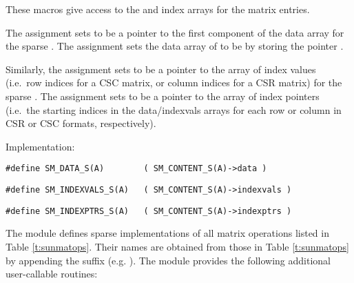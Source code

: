 \begin{itemize}
  These macros give access to the  and index arrays for
  the matrix entries.

  The assignment  sets  to be     
  a pointer to the first component of the data array for the
  sparse  .  The assignment  sets the data array of  to be  by storing
  the pointer . 
  
  Similarly, the assignment 
  sets  to be a pointer to the array of index values
  (i.e.~row indices for a CSC matrix, or column indices for a CSR
  matrix) for the sparse  .  The
  assignment 
  sets  to be a pointer to the array of index
  pointers (i.e.~the starting indices in the data/indexvals arrays for
  each row or column in CSR or CSC formats, respectively).
  
  Implementation:

  \verb|#define SM_DATA_S(A)        ( SM_CONTENT_S(A)->data )|

  \verb|#define SM_INDEXVALS_S(A)   ( SM_CONTENT_S(A)->indexvals )|

  \verb|#define SM_INDEXPTRS_S(A)   ( SM_CONTENT_S(A)->indexptrs )|

\end{itemize}
The {\sunmatsparse} module defines sparse implementations of all matrix
operations listed in Table \ref{t:sunmatops}. Their names are obtained
from those in Table \ref{t:sunmatops} by appending the
suffix  (e.g. ). 
The module {\sunmatsparse} provides the following additional
user-callable routines: 
